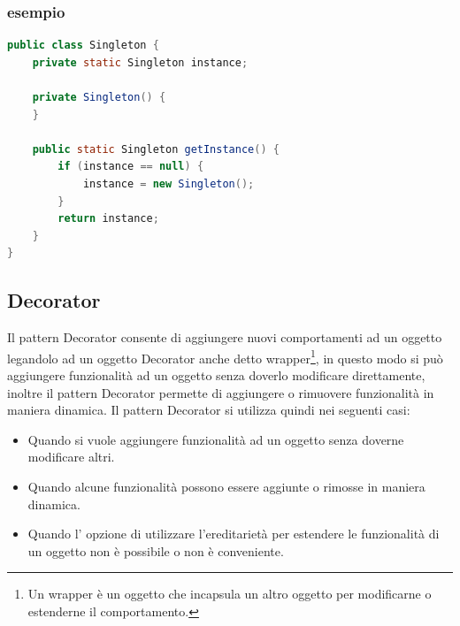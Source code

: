 \documentclass[11pt]{article}
\begin{document}
\subsubsection{esempio}
\begin{lstlisting}[language=Java]
public class Singleton {
    private static Singleton instance;

    private Singleton() {
    }

    public static Singleton getInstance() {
        if (instance == null) {
            instance = new Singleton();
        }
        return instance;
    }
}
\end{lstlisting}
\subsection{Decorator}
Il pattern Decorator consente di aggiungere nuovi comportamenti ad un oggetto legandolo ad un oggetto Decorator anche detto wrapper\footnote{Un wrapper è un oggetto che incapsula un altro oggetto per modificarne o estenderne il comportamento.},
in questo modo si può aggiungere funzionalità ad un oggetto senza doverlo modificare direttamente, inoltre il pattern Decorator permette di aggiungere o rimuovere funzionalità in maniera dinamica.
\newpage
{}
Il pattern Decorator si utilizza quindi nei seguenti casi:
\begin{itemize}
    \item Quando si vuole aggiungere funzionalità ad un oggetto senza doverne modificare altri.
    \item Quando alcune funzionalità possono essere aggiunte o rimosse in maniera dinamica.
    \item Quando l' opzione di utilizzare l'ereditarietà per estendere le funzionalità di un oggetto non è possibile o non è conveniente.
    \end{itemize}
\end{document}
